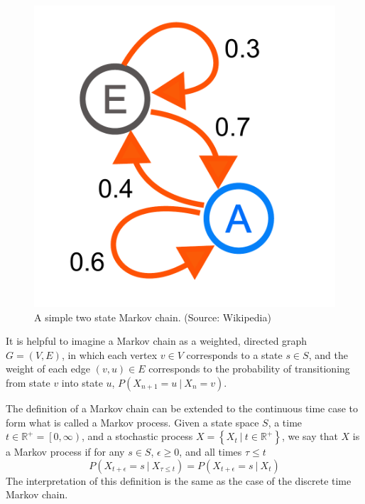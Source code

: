 \documentclass[tog]{acmsiggraph}
\newcommand{\given}[1][]{\:#1\vert\:}
\newcommand{\reals}{\mathbb{R}}
\begin{document}
\begin{figure}[h]
  \centering
  \includegraphics[scale=0.3]{MarkovChain.pdf}
  \caption{A simple two state Markov chain. (Source: Wikipedia)}
  \label{fig:markovChain}
\end{figure}

It is helpful to imagine a Markov chain as a weighted, directed graph $G = (V, E)$, 
in which each vertex $v \in V$ corresponds to a state $s \in S$, and the weight of 
each edge $\left(v, u \right) \in E$ corresponds to the probability of transitioning 
from state $v$ into state $u$, $P \left( X_{n+1} = u \given X_n = v \right)$.

The definition of a Markov chain can be extended to the continuous time case to form 
what is called a Markov process. Given a state space $S$, a time 
$t \in \reals^+ = \left[ 0, \infty \right)$, and a stochastic process 
$X = \left\{ X_t \given t \in \reals^+ \right\}$, we say that $X$ is a 
Markov process if for any $s \in S$, $\epsilon \geq 0$, and all times $\tau \leq t$
\begin{equation*}
  P \left( X_{t+\epsilon} = s \given X_{\tau \leq t} \right) = P \left( X_{t+\epsilon} = s \given X_t \right)
\end{equation*}
The interpretation of this definition is the same as the case of the discrete time Markov chain.
\end{document}
